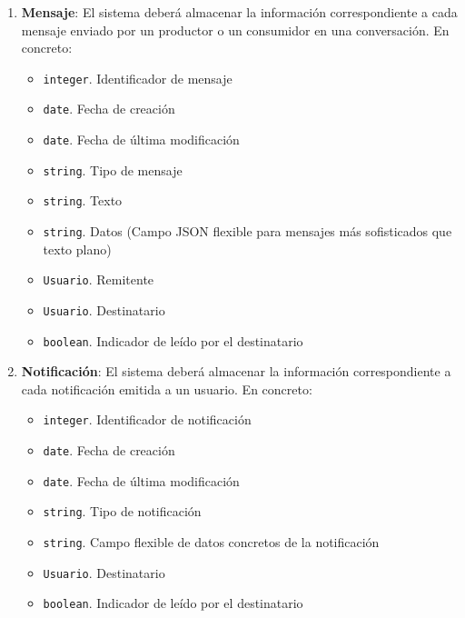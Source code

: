 \begin{enumerate}[label=IRQ-\protect\twodigits{\arabic*}:, align=left, leftmargin=*]
    \item \textbf{Mensaje}: El sistema deberá almacenar la información correspondiente a cada mensaje enviado por un productor o un consumidor en una conversación. En concreto:
    \begin{itemize}
        \item \texttt{integer}. Identificador de mensaje
        \item \texttt{date}. Fecha de creación
        \item \texttt{date}. Fecha de última modificación
        \item \texttt{string}. Tipo de mensaje
        \item \texttt{string}. Texto
        \item \texttt{string}. Datos (Campo JSON flexible para mensajes más sofisticados que texto plano)
        \item \texttt{Usuario}. Remitente
        \item \texttt{Usuario}. Destinatario
        \item \texttt{boolean}. Indicador de leído por el destinatario
    \end{itemize}

    
    \item \textbf{Notificación}: El sistema deberá almacenar la información correspondiente a cada notificación emitida a un usuario. En concreto:
    \begin{itemize}
        \item \texttt{integer}. Identificador de notificación
        \item \texttt{date}. Fecha de creación
        \item \texttt{date}. Fecha de última modificación
        \item \texttt{string}. Tipo de notificación
        \item \texttt{string}. Campo flexible de datos concretos de la notificación
        \item \texttt{Usuario}. Destinatario
        \item \texttt{boolean}. Indicador de leído por el destinatario
    \end{itemize}

\end{enumerate}


